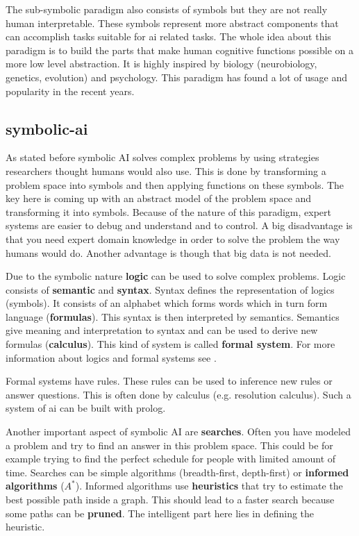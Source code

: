 \documentclass[jou,apacite]{apa6}
\begin{document}
The sub-symbolic paradigm also consists of symbols but they are not really human interpretable. These symbols represent more abstract components that can accomplish tasks suitable for \gls{ai} related tasks. The whole idea about this paradigm is to build the parts that make human cognitive functions possible on a more low level abstraction. It is highly inspired by biology (neurobiology, genetics, evolution) and psychology. This paradigm has found a lot of usage and popularity in the recent years.

\subsection{\gls{symbolic-ai}}
As stated before symbolic AI solves complex problems by using strategies researchers thought humans would also use. This is done by transforming a problem space into symbols and then applying functions on these symbols. The key here is coming up with an abstract model of the problem space and transforming it into symbols. Because of the nature of this paradigm, expert systems are easier to debug and understand and to control. A big disadvantage is that you need expert domain knowledge in order to solve the problem the way humans would do. Another advantage is though that big data is not needed.

Due to the symbolic nature \textbf{logic} can be used to solve complex problems. Logic consists of \textbf{semantic} and \textbf{syntax}. Syntax defines the representation of logics (symbols). It consists of an alphabet which forms words which in turn form language (\textbf{formulas}). This syntax is then interpreted by semantics. Semantics give meaning and interpretation to syntax and can be used to derive new formulas (\textbf{calculus}). This kind of system is called \textbf{formal system}. For more information about logics and formal systems see \cite{Richardson2006}. 

Formal systems have rules. These rules can be used to inference new rules or answer questions. This is often done by calculus (e.g. resolution calculus). Such a system of \gls{ai} can be built with \gls{prolog}.

Another important aspect of symbolic AI are \textbf{searches}. Often you have modeled a problem and try to find an answer in this problem space. This could be for example trying to find the perfect schedule for people with limited amount of time. Searches can be simple algorithms (breadth-first, depth-first) or \textbf{informed algorithms} ($A^*$). Informed algorithms use \textbf{heuristics} that try to estimate the best possible path inside a graph. This should lead to a faster search because some paths can be \textbf{pruned}. The intelligent part here lies in defining the heuristic.
\end{document}
